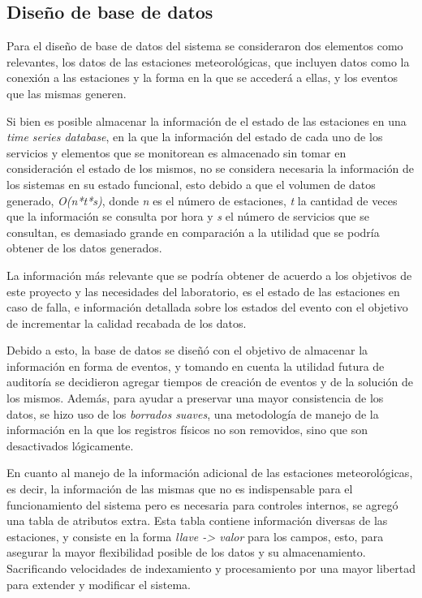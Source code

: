 \subsection{Diseño de base de datos}

Para el diseño de base de datos del sistema se consideraron dos elementos como relevantes, los datos de las estaciones meteorológicas, que incluyen datos como la conexión a las estaciones y la forma en la que se accederá a ellas, y los eventos que las mismas generen.

Si bien es posible almacenar la información de el estado de las estaciones en una \textit{time series database}, en la que la información del estado de cada uno de los servicios y elementos que se monitorean es almacenado sin tomar en consideración el estado de los mismos, no se considera necesaria la información de los sistemas en su estado funcional, esto debido a que el volumen de datos generado, \textit{O(n*t*s)}, donde \textit{n} es el número de estaciones, \textit{t} la cantidad de veces que la información se consulta por hora y \textit{s} el número de servicios que se consultan, es demasiado grande en comparación a la utilidad que se podría obtener de los datos generados.

La información más relevante que se podría obtener de acuerdo a los objetivos de este proyecto y las necesidades del laboratorio, es el estado de las estaciones en caso de falla, e información detallada sobre los estados del evento con el objetivo de incrementar la calidad recabada de los datos.

Debido a esto, la base de datos se diseñó con el objetivo de almacenar la información en forma de eventos, y tomando en cuenta la utilidad futura de auditoría se decidieron agregar tiempos de creación de eventos y de la solución de los mismos. Además, para ayudar a preservar una mayor consistencia de los datos, se hizo uso de los \textit{borrados suaves}, una metodología de manejo de la información en la que los registros físicos no son removidos, sino que son desactivados lógicamente.

En cuanto al manejo de la información adicional de las estaciones meteorológicas, es decir, la información de las mismas que no es indispensable para el funcionamiento del sistema pero es necesaria para controles internos, se agregó una tabla de atributos extra. Esta tabla contiene información diversas de las estaciones, y consiste en la forma \textit{llave -> valor} para los campos, esto, para asegurar la mayor flexibilidad posible de los datos y su almacenamiento. Sacrificando velocidades de indexamiento y procesamiento por una mayor libertad para extender y modificar el sistema.

